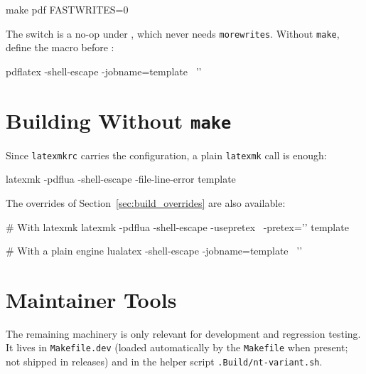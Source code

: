 \begin{bashcode}
make pdf FASTWRITES=0
\end{bashcode}

The switch is a no-op under , which never needs
\texttt{morewrites}.  Without \texttt{make}, define the macro before
\latexinline{\documentclass}:

\begin{bashcode}
pdflatex -shell-escape -jobname=template \
    '\def\ntmorewrites{}'
\end{bashcode}


\section{Building Without \texttt{make}}
\label{sec:build_nomake}

Since \verb!latexmkrc! carries the configuration, a plain \texttt{latexmk}
call is enough:

\begin{bashcode}
latexmk -pdflua -shell-escape -file-line-error template
\end{bashcode}

The overrides of Section~\ref{sec:build_overrides} are also available:

\begin{bashcode}
# With latexmk
latexmk -pdflua -shell-escape -usepretex \
    -pretex='\def\ntoverride{doctype=msc,lang=pt}' template

# With a plain engine
lualatex -shell-escape -jobname=template \
    '\def\ntoverride{doctype=msc,lang=pt}'
\end{bashcode}


\section{Maintainer Tools}
\label{sec:build_maintainer}

The remaining machinery is only relevant for \novathesis{} development and
regression testing.  It lives in \verb!Makefile.dev! (loaded automatically
by the \verb!Makefile! when present; not shipped in releases) and in the
helper script \verb!.Build/nt-variant.sh!.

